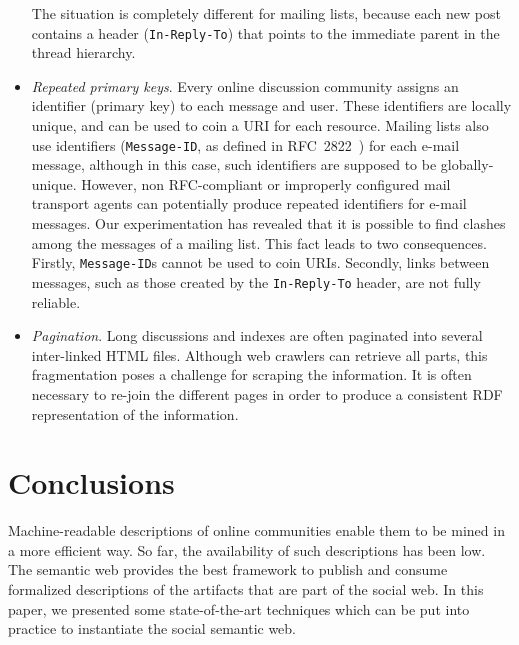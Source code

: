 \documentclass{../templates/www2008-submission}
\begin{document}
\begin{itemize}
        The situation is completely different for mailing lists, because
        each new post contains a header (\texttt{In-Reply-To}) that points
        to the immediate parent in the thread hierarchy.

  \item \emph{Repeated primary keys}. Every online discussion community assigns
        an identifier (primary key) to each message and user. These
        identifiers are locally unique, and can be used to coin a URI
        for each resource. Mailing lists also use identifiers
        (\texttt{Message-ID}, as defined in RFC~2822~\cite{RFC2822}) for
        each e-mail message, although in this case, such identifiers are
        supposed to be globally-unique. However, non RFC-compliant or
        improperly configured mail transport agents can potentially produce repeated
        identifiers for e-mail messages. Our experimentation has
        revealed that it is possible to find clashes among the messages
        of a mailing list. This fact leads to two consequences. Firstly,
        \texttt{Message-ID}s cannot be used to coin URIs. Secondly,
        links between messages, such as those created by the
        \texttt{In-Reply-To} header, are not fully reliable.

  \item \emph{Pagination}. Long discussions and indexes are often paginated
        into several inter-linked HTML files. Although web crawlers can
        retrieve all parts, this fragmentation poses a challenge for
        scraping the information. It is often necessary to re-join the
        different pages in order to produce a consistent RDF representation
        of the information.

\end{itemize}


\section{Conclusions}\label{sec:conclusions}

Machine-readable descriptions of online communities enable them
to be mined in a more efficient way. So far, the availability of
such descriptions has been low. The semantic web provides the
best framework to publish and consume formalized descriptions of
the artifacts that are part of the social web. In this paper,
we presented some state-of-the-art techniques which can be
put into practice to instantiate the social semantic web.
\end{document}
